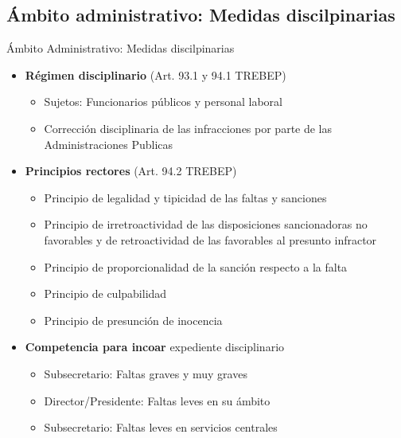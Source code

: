 \documentclass{beamer}
\begin{document}
    \subsection{Ámbito administrativo: Medidas discilpinarias}
    \begin{frame}{Ámbito Administrativo: Medidas discilpinarias}
        \begin{itemize}
            \item \textbf{Régimen disciplinario} (Art. 93.1 y 94.1 TREBEP)
            \begin{itemize}
                \item Sujetos: Funcionarios públicos y personal laboral
                \item Corrección disciplinaria de las infracciones por parte de las Administraciones Publicas
            \end{itemize}
            \item \textbf{Principios rectores} (Art. 94.2 TREBEP)
            \begin{itemize}
                \item Principio de legalidad y tipicidad de las faltas y sanciones
                \item Principio de irretroactividad de las disposiciones sancionadoras no favorables y de retroactividad de las favorables al presunto infractor
                \item Principio de proporcionalidad de la sanción respecto a la falta
                \item Principio de culpabilidad
                \item Principio de presunción de inocencia
            \end{itemize}
            \item \textbf{Competencia para incoar} expediente disciplinario
            \begin{itemize}
                \item Subsecretario: Faltas graves y muy graves
                \item Director/Presidente: Faltas leves en su ámbito
                \item Subsecretario: Faltas leves en servicios centrales
            \end{itemize}
        \end{itemize}
    \end{frame}
\end{document}
